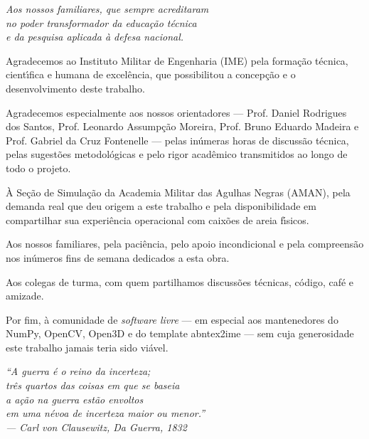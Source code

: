 
\begin{dedicatoria}
   \vspace*{\fill}
   \begin{flushright}
   \noindent
   \textit{Aos nossos familiares, que sempre acreditaram\\
   no poder transformador da educa\c{c}\~ao t\'ecnica\\
   e da pesquisa aplicada \`a defesa nacional.}
   \end{flushright}
\end{dedicatoria}

\begin{agradecimentos}
Agradecemos ao Instituto Militar de Engenharia (IME) pela forma\c{c}\~ao t\'ecnica, cient\'\i fica e humana de excel\^encia, que possibilitou a concep\c{c}\~ao e o desenvolvimento deste trabalho.

Agradecemos especialmente aos nossos orientadores --- Prof. Daniel Rodrigues dos Santos, Prof. Leonardo Assump\c{c}\~ao Moreira, Prof. Bruno Eduardo Madeira e Prof. Gabriel da Cruz Fontenelle --- pelas in\'umeras horas de discuss\~ao t\'ecnica, pelas sugest\~oes metodol\'ogicas e pelo rigor acad\^emico transmitidos ao longo de todo o projeto.

\`A Se\c{c}\~ao de Simula\c{c}\~ao da Academia Militar das Agulhas Negras (AMAN), pela demanda real que deu origem a este trabalho e pela disponibilidade em compartilhar sua experi\^encia operacional com caix\~oes de areia f\'\i sicos.

Aos nossos familiares, pela paci\^encia, pelo apoio incondicional e pela compreens\~ao nos in\'umeros fins de semana dedicados a esta obra.

Aos colegas de turma, com quem partilhamos discuss\~oes t\'ecnicas, c\'odigo, caf\'e e amizade.

Por fim, \`a comunidade de \emph{software livre} --- em especial aos mantenedores do NumPy, OpenCV, Open3D e do template abntex2ime --- sem cuja generosidade este trabalho jamais teria sido vi\'avel.
\end{agradecimentos}

\begin{epigrafe}
    \vspace*{\fill}
    \begin{flushright}
        \textit{``A guerra \'e o reino da incerteza;\\
        tr\^es quartos das coisas em que se baseia\\
        a a\c{c}\~ao na guerra est\~ao envoltos\\
        em uma n\'evoa de incerteza maior ou menor.''\\
        --- Carl von Clausewitz, \emph{Da Guerra}, 1832}
    \end{flushright}
\end{epigrafe}

